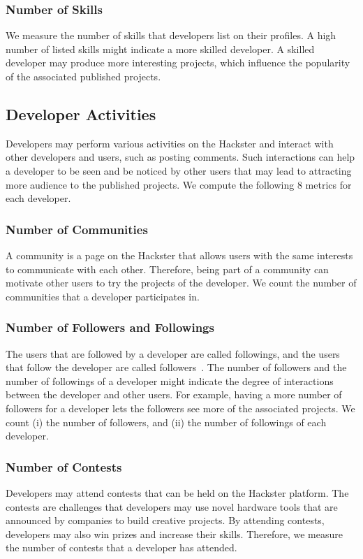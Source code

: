 \subsubsection*{Number of Skills} We measure the number of skills that
developers list on their profiles. A high number of listed skills might
indicate a more skilled developer. A skilled developer may produce more
interesting projects, which influence the popularity of the associated
published projects.

\subsection{Developer Activities}

Developers may perform various activities on the Hackster and interact with
other developers and users, such as posting comments. Such interactions can
help a developer to be seen and be noticed by other users that may lead to
attracting more audience to the published projects. We compute the following
$8$ metrics for each developer.  

\subsubsection*{Number of Communities}
A community is a page on the Hackster that allows users with the same interests to communicate with each other.
Therefore, being part of a community can motivate other users to try the projects of the developer.
We count the number of communities that a developer participates in.

\subsubsection*{Number of Followers and Followings}
The users that are followed by a developer are called followings, and the users that follow the developer are called followers~\cite{crawford2009following}.
The number of followers and the number of followings of a developer might indicate the degree of interactions between the developer and other users. For example, having a more number of followers for a developer lets the followers see more of the associated projects. We count (i) the number of followers, and (ii) the number of followings of each developer.

\subsubsection*{Number of Contests}
Developers may attend contests that can be held on the Hackster platform.
The contests are challenges that developers may use novel hardware tools that are announced by companies to build creative projects.
By attending contests, developers may also win prizes and increase their skills. Therefore, we measure the number of contests that a developer has attended.

